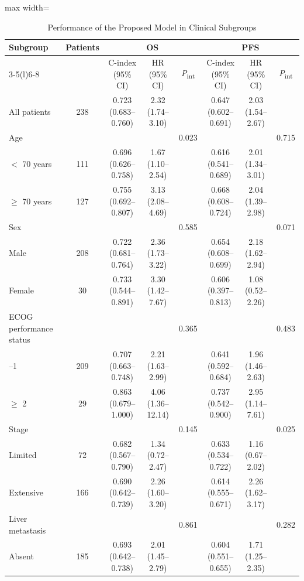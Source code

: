 \documentclass{article}
\begin{document}
\begin{table}[htbp]
\centering
\setlength{\belowcaptionskip}{4pt}
\caption{Performance of the Proposed Model in Clinical Subgroups}
\label{tab:subgroups}
\footnotesize\setlength{\tabcolsep}{2.5pt}
\begin{adjustbox}{max width=\textwidth}
\begin{tabular}{@{}lc ccc ccc@{}}
\toprule
Subgroup & Patients & \multicolumn{3}{c}{OS} & \multicolumn{3}{c}{PFS} \\
\cmidrule(lr){3-5}\cmidrule(l){6-8}
 & & C-index (95\% CI) & HR (95\% CI) & \textit{P}\textsubscript{int} & C-index (95\% CI) & HR (95\% CI) & \textit{P}\textsubscript{int} \\
\midrule
All patients & 238 & 0.723 (0.683--0.760) & 2.32 (1.74--3.10) & & 0.647 (0.602--0.691) & 2.03 (1.54--2.67) & \\
\addlinespace
Age & & & & 0.023 & & & 0.715 \\
\quad $<$ 70 years & 111 & 0.696 (0.626--0.758) & 1.67 (1.10--2.54) & & 0.616 (0.541--0.689) & 2.01 (1.34--3.01) & \\
\quad $\geq$ 70 years & 127 & 0.755 (0.692--0.807) & 3.13 (2.08--4.69) & & 0.668 (0.608--0.724) & 2.04 (1.39--2.98) & \\
Sex & & & & 0.585 & & & 0.071 \\
\quad Male & 208 & 0.722 (0.681--0.764) & 2.36 (1.73--3.22) & & 0.654 (0.608--0.699) & 2.18 (1.62--2.94) & \\
\quad Female & 30 & 0.733 (0.544--0.891) & 3.30 (1.42--7.67) & & 0.606 (0.397--0.813) & 1.08 (0.52--2.26) & \\
ECOG performance status & & & & 0.365 & & & 0.483 \\
\quad 0--1 & 209 & 0.707 (0.663--0.748) & 2.21 (1.63--2.99) & & 0.641 (0.592--0.684) & 1.96 (1.46--2.63) & \\
\quad $\geq$ 2 & 29 & 0.863 (0.679--1.000) & 4.06 (1.36--12.14) & & 0.737 (0.542--0.900) & 2.95 (1.14--7.61) & \\
Stage & & & & 0.145 & & & 0.025 \\
\quad Limited & 72 & 0.682 (0.567--0.790) & 1.34 (0.72--2.47) & & 0.633 (0.534--0.722) & 1.16 (0.67--2.02) & \\
\quad Extensive & 166 & 0.690 (0.642--0.739) & 2.26 (1.60--3.20) & & 0.614 (0.555--0.671) & 2.26 (1.62--3.17) & \\
Liver metastasis & & & & 0.861 & & & 0.282 \\
\quad Absent & 185 & 0.693 (0.642--0.738) & 2.01 (1.45--2.79) & & 0.604 (0.551--0.655) & 1.71 (1.25--2.35) & \\

\end{tabular}
\end{adjustbox}
\end{table}
\end{document}
